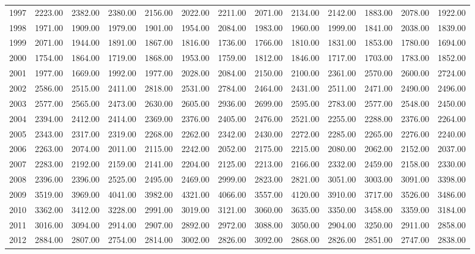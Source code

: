 \begin{longtable}{rrrrrrrrrrrrr}
  1997 & 2223.00 & 2382.00 & 2380.00 & 2156.00 & 2022.00 & 2211.00 & 2071.00 & 2134.00 & 2142.00 & 1883.00 & 2078.00 & 1922.00 \\ 
  1998 & 1971.00 & 1909.00 & 1979.00 & 1901.00 & 1954.00 & 2084.00 & 1983.00 & 1960.00 & 1999.00 & 1841.00 & 2038.00 & 1839.00 \\ 
  1999 & 2071.00 & 1944.00 & 1891.00 & 1867.00 & 1816.00 & 1736.00 & 1766.00 & 1810.00 & 1831.00 & 1853.00 & 1780.00 & 1694.00 \\ 
  2000 & 1754.00 & 1864.00 & 1719.00 & 1868.00 & 1953.00 & 1759.00 & 1812.00 & 1846.00 & 1717.00 & 1703.00 & 1783.00 & 1852.00 \\ 
  2001 & 1977.00 & 1669.00 & 1992.00 & 1977.00 & 2028.00 & 2084.00 & 2150.00 & 2100.00 & 2361.00 & 2570.00 & 2600.00 & 2724.00 \\ 
  2002 & 2586.00 & 2515.00 & 2411.00 & 2818.00 & 2531.00 & 2784.00 & 2464.00 & 2431.00 & 2511.00 & 2471.00 & 2490.00 & 2496.00 \\ 
  2003 & 2577.00 & 2565.00 & 2473.00 & 2630.00 & 2605.00 & 2936.00 & 2699.00 & 2595.00 & 2783.00 & 2577.00 & 2548.00 & 2450.00 \\ 
  2004 & 2394.00 & 2412.00 & 2414.00 & 2369.00 & 2376.00 & 2405.00 & 2476.00 & 2521.00 & 2255.00 & 2288.00 & 2376.00 & 2264.00 \\ 
  2005 & 2343.00 & 2317.00 & 2319.00 & 2268.00 & 2262.00 & 2342.00 & 2430.00 & 2272.00 & 2285.00 & 2265.00 & 2276.00 & 2240.00 \\ 
  2006 & 2263.00 & 2074.00 & 2011.00 & 2115.00 & 2242.00 & 2052.00 & 2175.00 & 2215.00 & 2080.00 & 2062.00 & 2152.00 & 2037.00 \\ 
  2007 & 2283.00 & 2192.00 & 2159.00 & 2141.00 & 2204.00 & 2125.00 & 2213.00 & 2166.00 & 2332.00 & 2459.00 & 2158.00 & 2330.00 \\ 
  2008 & 2396.00 & 2396.00 & 2525.00 & 2495.00 & 2469.00 & 2999.00 & 2823.00 & 2821.00 & 3051.00 & 3003.00 & 3091.00 & 3398.00 \\ 
  2009 & 3519.00 & 3969.00 & 4041.00 & 3982.00 & 4321.00 & 4066.00 & 3557.00 & 4120.00 & 3910.00 & 3717.00 & 3526.00 & 3486.00 \\ 
  2010 & 3362.00 & 3412.00 & 3228.00 & 2991.00 & 3019.00 & 3121.00 & 3060.00 & 3635.00 & 3350.00 & 3458.00 & 3359.00 & 3184.00 \\ 
  2011 & 3016.00 & 3094.00 & 2914.00 & 2907.00 & 2892.00 & 2972.00 & 3088.00 & 3050.00 & 2904.00 & 3250.00 & 2911.00 & 2858.00 \\ 
  2012 & 2884.00 & 2807.00 & 2754.00 & 2814.00 & 3002.00 & 2826.00 & 3092.00 & 2868.00 & 2826.00 & 2851.00 & 2747.00 & 2838.00 \\ 

\end{longtable}
